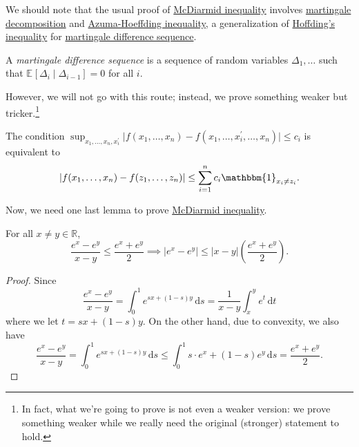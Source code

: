 We should note that the usual proof of \hyperref[thm:McDiarmid-inequality]{McDiarmid inequality} involves \href{https://en.wikipedia.org/wiki/Doob_decomposition_theorem}{martingale decomposition} and \href{https://en.wikipedia.org/wiki/Azuma%27s_inequality}{Azuma-Hoeffding inequality}, a generalization of \hyperref[thm:Hoeffding-inequality]{Hoffding's inequality} for \hyperref[def:martingale-difference-sequence]{martingale difference sequence}.

\begin{definition}\label{def:martingale-difference-sequence}
	A \emph{martingale difference sequence} is a sequence of random variables \(\Delta _1, \dots \) such that \(\mathbb{E}_{}\left[\Delta _i \mid \Delta _{i-1} \right] = 0\) for all \(i\).
\end{definition}

However, we will not go with this route; instead, we prove something weaker but tricker.\footnote{In fact, what we're going to prove is not even a weaker version: we prove something weaker while we really need the original (stronger) statement to hold.}

\begin{note}
	The condition \(\sup _{x_1, \dots , x_n, x_i^{\prime} }\vert f(x_1, \dots , x_n) - f(x_1, \dots , x_i^{\prime} , \dots , x_n) \vert \leq c_i\) is equivalent to
	\[
		\vert f(x_1, \dots , x_n) - f(z_1, \dots , z_n) \vert \leq \sum_{i=1}^{n} c_i \mathbbm{1}_{x_i \neq z_i}.
	\]
\end{note}

Now, we need one last lemma to prove \hyperref[thm:McDiarmid-inequality]{McDiarmid inequality}.

\begin{lemma}\label{lma:lec5}
	For all \(x \neq y \in \mathbb{R} \),
	\[
		\frac{e^x - e^y}{x-y} \leq \frac{e^x + e^y}{2} \implies \vert e^x - e^y \vert \leq \vert x - y \vert \left( \frac{e^x + e^y}{2} \right).
	\]
\end{lemma}
\begin{proof}
	Since
	\[
		\frac{e^x - e^y}{x-y}
		= \int_{0}^{1} e^{s x + (1 - s)y} \,\mathrm{d}s
		= \frac{1}{x - y} \int_{x}^{y} e^t \,\mathrm{d}t
	\]
	where we let \(t = sx + (1 - s)y\). On the other hand, due to convexity, we also have
	\[
		\frac{e^x - e^y}{x-y}
		= \int_{0}^{1} e^{s x + (1 - s)y} \,\mathrm{d}s
		\leq \int_{0}^{1} s\cdot e^x + (1 - s)e^y \,\mathrm{d}s
		= \frac{e^x + e^y}{2}.
	\]
\end{proof}

